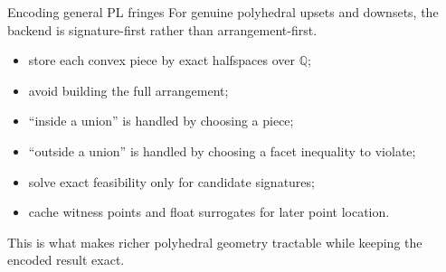 \documentclass[aspectratio=169,11pt]{beamer}
\newcommand{\Q}{\mathbb{Q}}
\begin{document}
\begin{frame}{Encoding general PL fringes}
\small
For genuine polyhedral upsets and downsets, the backend is signature-first rather than arrangement-first.

\begin{itemize}
  \item store each convex piece by exact halfspaces over $\Q$;
  \item avoid building the full arrangement;
  \item ``inside a union'' is handled by choosing a piece;
  \item ``outside a union'' is handled by choosing a facet inequality to violate;
  \item solve exact feasibility only for candidate signatures;
  \item cache witness points and float surrogates for later point location.
\end{itemize}

\centering
{}

\medskip
\raggedright
This is what makes richer polyhedral geometry tractable while keeping the encoded result exact.
\end{frame}
\end{document}
